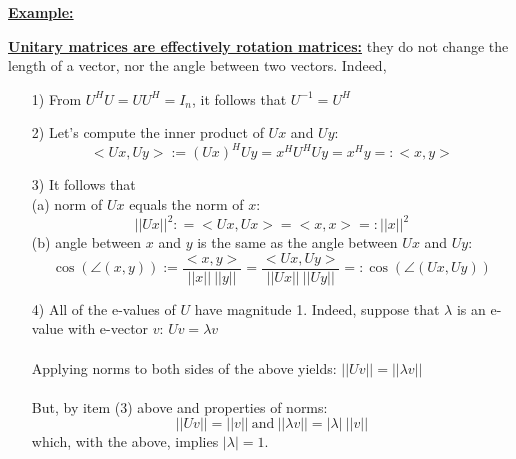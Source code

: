 \documentclass[letterpaper]{article}
\begin{document}
\noindent \textbf{\underline{Example:}}


\newpage

\noindent \textbf{\underline{Unitary matrices are effectively rotation matrices:}} they do not change the length of a vector, nor the angle between two vectors. Indeed,
\vspace*{-.2in}
\begin{enumerate}
\setlength{\itemsep}{1cm}
\item[1)] From $U^H U = U U^H=I_n$, it follows that $U^{-1} =U^H$
\item[2)]  Let's compute the inner product of $U x$ and $U y$:
    $$ <U x,U y>:=(U x)^H U y = x^H U^H U y = x^H y = :<x,y>$$
\item[3)] It follows that \\
    (a) norm of $U x$ equals the norm of $x$:
       $$||U x||^2: = <U x,U x>=<x,x>=:||x||^2$$
    (b) angle between $x$ and $y$ is the same as the angle between $U x$ and $U y$:
    $$\cos(\angle(x,y)):=\frac{<x,y>}{||x||~ ||y||}=\frac{<U x,U y>}{||U x||~ ||U y||} =: \cos(\angle(U x,U y))$$
\item[4)] All of the e-values of $U$ have magnitude 1. Indeed, suppose that $\lambda$ is an e-value with e-vector $v$: $Uv=\lambda v$ \\
    \\
Applying norms to both sides of the above yields: $||Uv||=||\lambda v||$ \\
\\
But, by item (3) above and properties of norms:
$$ ||Uv||=||v||~\text{and}~ ||\lambda v||=|\lambda|~||v||$$
which, with the above, implies $|\lambda|=1$.
\end{enumerate}

\newpage
\end{document}
